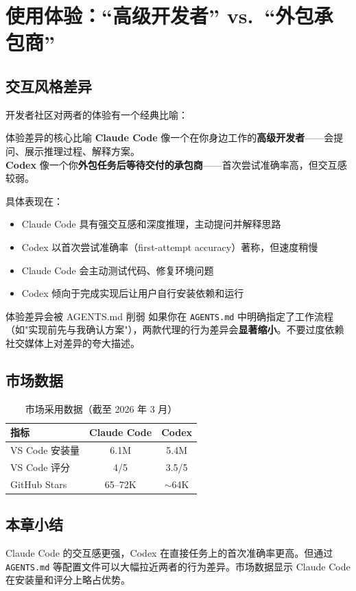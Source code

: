 \section{使用体验：``高级开发者'' vs.\ ``外包承包商''}

\subsection{交互风格差异}

开发者社区对两者的体验有一个经典比喻：

\begin{importantbox}{体验差异的核心比喻}
\textbf{Claude Code} 像一个在你身边工作的\textbf{高级开发者}——会提问、展示推理过程、解释方案。\\[0.3em]
\textbf{Codex} 像一个你\textbf{外包任务后等待交付的承包商}——首次尝试准确率高，但交互感较弱。
\end{importantbox}

具体表现在：

\begin{itemize}
    \item Claude Code 具有强交互感和深度推理，主动提问并解释思路
    \item Codex 以首次尝试准确率（first-attempt accuracy）著称，但速度稍慢
    \item Claude Code 会主动测试代码、修复环境问题
    \item Codex 倾向于完成实现后让用户自行安装依赖和运行
\end{itemize}

\begin{warningbox}{体验差异会被 AGENTS.md 削弱}
如果你在 \texttt{AGENTS.md} 中明确指定了工作流程（如"实现前先与我确认方案"），两款代理的行为差异会\textbf{显著缩小}。不要过度依赖社交媒体上对差异的夸大描述。
\end{warningbox}

\subsection{市场数据}

\begin{table}[H]
\centering
\caption{市场采用数据（截至 2026 年 3 月）}
\begin{tabular}{lcc}
\toprule
\textbf{指标} & \textbf{Claude Code} & \textbf{Codex} \\
\midrule
VS Code 安装量 & 6.1M & 5.4M \\
VS Code 评分 & 4/5 & 3.5/5 \\
GitHub Stars & 65--72K & $\sim$64K \\
\bottomrule
\end{tabular}
\end{table}

\subsection{本章小结}

Claude Code 的交互感更强，Codex 在直接任务上的首次准确率更高。但通过 \texttt{AGENTS.md} 等配置文件可以大幅拉近两者的行为差异。市场数据显示 Claude Code 在安装量和评分上略占优势。

